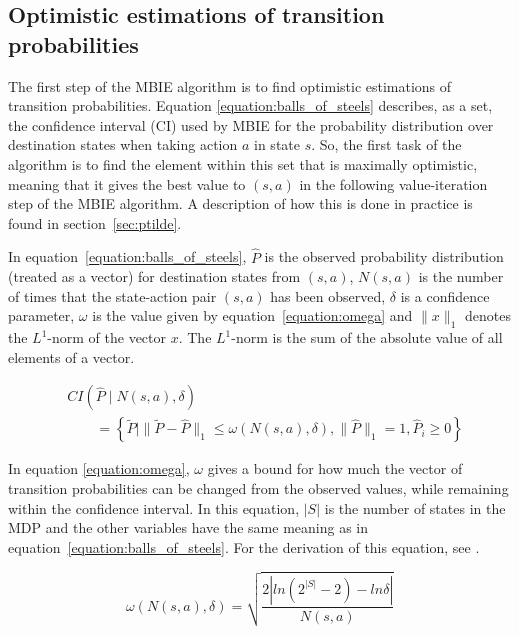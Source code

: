 \subsection{Optimistic estimations of transition probabilities}
\label{sec:computep}

The first step of the MBIE algorithm is to find optimistic estimations of
transition probabilities. Equation \eqref{equation:balls_of_steels} describes,
as a set, the confidence interval (CI) used by MBIE for the probability
distribution over destination states when taking action $a$ in state $s$. So,
the first task of the algorithm is to find the element within this set that is
maximally optimistic, meaning that it gives the best value to $(s,a)$ in the
following value-iteration step of the MBIE algorithm. A description of how this
is done in practice is found in section~\ref{sec:ptilde}. 

In equation~\eqref{equation:balls_of_steels}, $\hat{P}$ is the observed
probability distribution (treated as a vector) for destination states from
$(s,a)$, $N(s,a)$ is the number of times that the state-action pair $(s,a)$ has
been observed, $\delta$ is a confidence parameter,  $\omega$ is the value given
by equation~\eqref{equation:omega} and $\|x\|_1$ denotes the $L^1$-norm of the vector $x$.
The $L^1$-norm is the sum of the absolute value of all elements of a vector. 

\begin{align}
\label{equation:balls_of_steels}
& CI\left(\hat{P} \mid N(s, a), \delta\right) \nonumber \\
& \qquad = \left\{\tilde{P} \mid \|\tilde{P} - \hat{P}\|_1 \le \omega(N(s,a), \delta), \|\hat{P}\|_1 = 1, \hat{P}_i \geq 0  \right\}
\end{align}

In equation \eqref{equation:omega}, $\omega$ gives a bound for how much the
vector of transition probabilities can be changed from the observed values,
while remaining within the confidence interval. In this equation, $|S|$ is the
number of states in the MDP and the other variables have the same meaning as in
equation~\eqref{equation:balls_of_steels}. For the derivation of this equation,
see \textcite{Strehl20081309}.

\begin{equation}
\label{equation:omega}
   \omega(N(s,a),\delta) = {\sqrt{\frac{2|ln(2^{|S|}-2) - ln  \delta |}{N(s,a)}}}
\end{equation}
